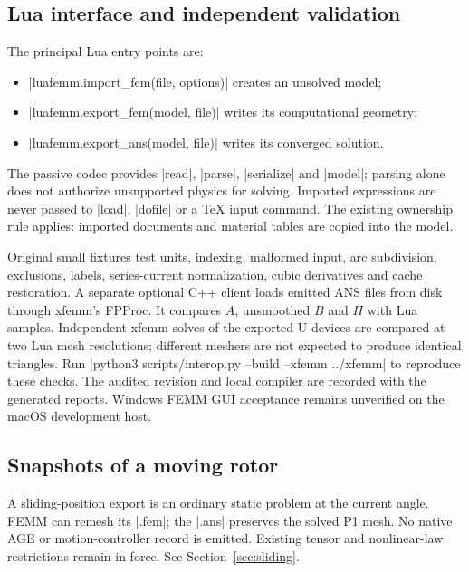 \subsection{Lua interface and independent validation}

The principal Lua entry points are:
\begin{itemize}
\item |luafemm.import_fem(file, options)| creates an unsolved model;
\item |luafemm.export_fem(model, file)| writes its computational geometry;
\item |luafemm.export_ans(model, file)| writes its converged solution.
\end{itemize}
The passive codec provides |read|, |parse|, |serialize| and |model|; parsing alone
does not authorize unsupported physics for solving. Imported expressions are
never passed to |load|, |dofile| or a TeX input command. The existing ownership
rule applies: imported documents and material tables are copied into the model.

Original small fixtures test units, indexing, malformed input, arc subdivision,
exclusions, labels, series-current normalization, cubic derivatives and cache
restoration. A separate optional C++ client loads emitted ANS files from disk
through xfemm's FPProc. It compares $A$, unsmoothed $B$ and $H$ with Lua samples.
Independent xfemm solves of the exported U devices are compared at two Lua mesh
resolutions; different meshers are not expected to produce identical triangles.
Run |python3 scripts/interop.py --build --xfemm ../xfemm| to reproduce these checks.
The audited revision and local compiler are recorded with the generated reports.
Windows FEMM GUI acceptance remains unverified on the macOS development host.

\subsection{Snapshots of a moving rotor}
A sliding-position export is an ordinary static problem at the current angle.
FEMM can remesh its |.fem|; the |.ans| preserves the solved P1 mesh. No native AGE
or motion-controller record is emitted. Existing tensor and nonlinear-law
restrictions remain in force. See Section~\ref{sec:sliding}.
